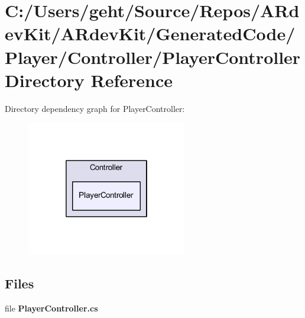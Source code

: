 \section{C\-:/\-Users/geht/\-Source/\-Repos/\-A\-Rdev\-Kit/\-A\-Rdev\-Kit/\-Generated\-Code/\-Player/\-Controller/\-Player\-Controller Directory Reference}
\label{dir_df85c0153396420545218fb1fbdaa680}
Directory dependency graph for Player\-Controller\-:
\nopagebreak
\begin{figure}[H]
\begin{center}
\leavevmode
\includegraphics[width=198pt]{dir_df85c0153396420545218fb1fbdaa680_dep}
\end{center}
\end{figure}
\subsection*{Files}
\begin{DoxyCompactItemize}
\item 
file {\bfseries Player\-Controller.\-cs}
\end{DoxyCompactItemize}
